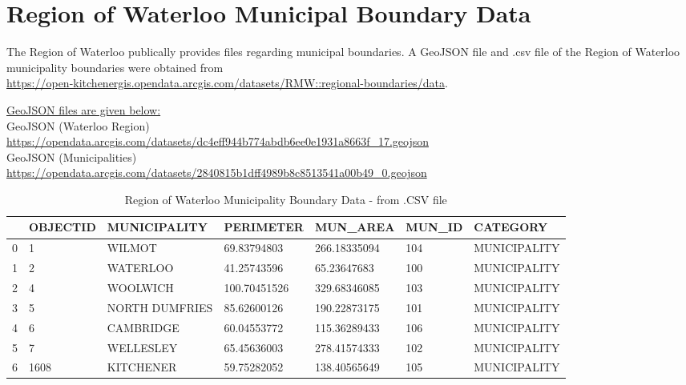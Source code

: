 \documentclass[10pt,a4paper]{report}
\begin{document}
\newpage
	\section{Region of Waterloo Municipal Boundary Data}
	
	The Region of Waterloo publically provides files regarding municipal boundaries. A GeoJSON file and .csv file of the Region of Waterloo municipality boundaries were obtained from \\
	
	\noindent  \url{https://open-kitchenergis.opendata.arcgis.com/datasets/RMW::regional-boundaries/data}.
	
	\noindent \underline{GeoJSON files are given below:}\\
	
	\noindent GeoJSON (Waterloo Region)\\ \url{https://opendata.arcgis.com/datasets/dc4eff944b774abdb6ee0e1931a8663f_17.geojson}\\
	
	\noindent GeoJSON (Municipalities)\\ \url{https://opendata.arcgis.com/datasets/2840815b1dff4989b8c8513541a00b49_0.geojson}
	
	

	\begin{table}[h!]
		\centering
		\caption{Region of Waterloo Municipality Boundary Data - from .CSV file}
		\label{CSV_MunBoundary}
				\begin{adjustbox}{width=1\textwidth}
			\small
		\begin{tabular}{@{}lllllll@{}}
			\toprule
			& OBJECTID & MUNICIPALITY   & PERIMETER    & MUN\_AREA & MUN\_ID & CATEGORY     \\ \midrule
			0 & 1        & WILMOT         & 69.83794803  & 266.18335094            & 104            & MUNICIPALITY \\
			1 & 2        & WATERLOO       & 41.25743596  & 65.23647683             & 100            & MUNICIPALITY \\
			2 & 4        & WOOLWICH       & 100.70451526 & 329.68346085            & 103            & MUNICIPALITY \\
			3 & 5        & NORTH DUMFRIES & 85.62600126  & 190.22873175            & 101            & MUNICIPALITY \\
			4 & 6        & CAMBRIDGE      & 60.04553772  & 115.36289433            & 106            & MUNICIPALITY \\
			5 & 7        & WELLESLEY      & 65.45636003  & 278.41574333            & 102            & MUNICIPALITY \\
			6 & 1608     & KITCHENER      & 59.75282052  & 138.40565649            & 105            & MUNICIPALITY \\ \bottomrule
		\end{tabular}
		\end{adjustbox}
	\end{table}
\end{document}
